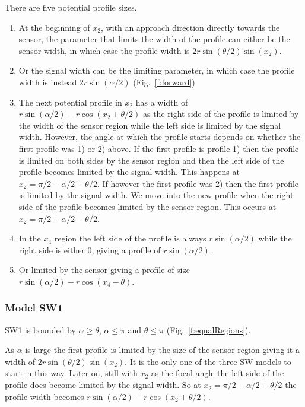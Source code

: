 There are five potential profile sizes. 
\begin{enumerate}
\item At the beginning of $x_2$, with an approach direction directly towards the sensor, the parameter that limits the width of the profile can either be the sensor width,  in which case the profile width is $2r\sin\left(\theta/2\right)\sin(x_2)$. 
\item Or the signal width can be the limiting parameter, in which case the profile width is instead $2r\sin(\alpha /2)$ (Fig.~\ref{f:forward})
\item The next potential profile in $x_2$ has a width of $r\sin(\alpha/2) - r\cos(x_2 + \theta/2)$ as the right side of the profile is limited by the width of the sensor region while the left side is limited by the signal width. However, the angle at which the profile starts depends on whether the first profile was 1) or 2) above. If the first profile is profile 1) then the profile is limited on both sides by the sensor region and then the left side of the profile becomes limited by the signal width. This happens at $x_2 = \pi/2 - \alpha/2 + \theta/2$. If however the first profile was 2) then the first profile is limited by the signal width. We move into the new profile when the right side of the profile becomes limited by the sensor region. This occurs at $x_2 = \pi/2 + \alpha/2 - \theta/2$.


\item In the $x_4$ region the left side of the profile is always $r\sin(\alpha /2)$ while the right side is either 0, giving a profile of $r\sin(\alpha /2)$. 

\item Or limited by the sensor giving a profile of size $r\sin (\alpha /2) -r\cos(x_4-\theta) $.
\end{enumerate}

\subsubsection{Model SW1} \label{SW1}

SW1 is bounded by $\alpha \ge \theta$, $\alpha \le\pi$ and $\theta \le \pi$ (Fig.~\ref{f:equalRegions}).

As $\alpha $ is large the first profile is limited by the size of the sensor region giving it a width of $2r\sin\left(\theta/2\right)\sin(x_2)$. It is the only one of the three SW models to start in this way. Later on, still with $x_2$ as the focal angle the left side of the profile does become limited by the signal width. So at $x_2= \pi/2 - \alpha/2 + \theta/2$ the profile width becomes $r\sin(\alpha/2) - r\cos(x_2 + \theta/2)$. 

